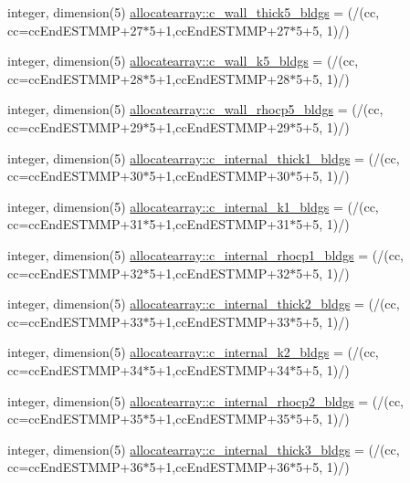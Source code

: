 \begin{DoxyCompactItemize}
\item 
integer, dimension(5) \hyperlink{namespaceallocatearray_ad95655da9944167e0208bf8454674fb6}{allocatearray\+::c\+\_\+wall\+\_\+thick5\+\_\+bldgs} = (/(cc, cc=cc\+End\+E\+S\+T\+M\+MP+27$\ast$5+1,cc\+End\+E\+S\+T\+M\+MP+27$\ast$5+5, 1)/)
\item 
integer, dimension(5) \hyperlink{namespaceallocatearray_a53001a7584fdc2aafd07c9e6809df27f}{allocatearray\+::c\+\_\+wall\+\_\+k5\+\_\+bldgs} = (/(cc, cc=cc\+End\+E\+S\+T\+M\+MP+28$\ast$5+1,cc\+End\+E\+S\+T\+M\+MP+28$\ast$5+5, 1)/)
\item 
integer, dimension(5) \hyperlink{namespaceallocatearray_a9fd17628369d7e612fbb9190cf2c92f2}{allocatearray\+::c\+\_\+wall\+\_\+rhocp5\+\_\+bldgs} = (/(cc, cc=cc\+End\+E\+S\+T\+M\+MP+29$\ast$5+1,cc\+End\+E\+S\+T\+M\+MP+29$\ast$5+5, 1)/)
\item 
integer, dimension(5) \hyperlink{namespaceallocatearray_a36130c9abba030f79380a76d8a252f2a}{allocatearray\+::c\+\_\+internal\+\_\+thick1\+\_\+bldgs} = (/(cc, cc=cc\+End\+E\+S\+T\+M\+MP+30$\ast$5+1,cc\+End\+E\+S\+T\+M\+MP+30$\ast$5+5, 1)/)
\item 
integer, dimension(5) \hyperlink{namespaceallocatearray_af2158ba2afb645dfef8aeb1a93a1dec7}{allocatearray\+::c\+\_\+internal\+\_\+k1\+\_\+bldgs} = (/(cc, cc=cc\+End\+E\+S\+T\+M\+MP+31$\ast$5+1,cc\+End\+E\+S\+T\+M\+MP+31$\ast$5+5, 1)/)
\item 
integer, dimension(5) \hyperlink{namespaceallocatearray_a1592e6ac2bce2d65c9e0ebe0e5c97122}{allocatearray\+::c\+\_\+internal\+\_\+rhocp1\+\_\+bldgs} = (/(cc, cc=cc\+End\+E\+S\+T\+M\+MP+32$\ast$5+1,cc\+End\+E\+S\+T\+M\+MP+32$\ast$5+5, 1)/)
\item 
integer, dimension(5) \hyperlink{namespaceallocatearray_af11e6ee064aaacc4d28820ad00309f0d}{allocatearray\+::c\+\_\+internal\+\_\+thick2\+\_\+bldgs} = (/(cc, cc=cc\+End\+E\+S\+T\+M\+MP+33$\ast$5+1,cc\+End\+E\+S\+T\+M\+MP+33$\ast$5+5, 1)/)
\item 
integer, dimension(5) \hyperlink{namespaceallocatearray_ab244f908ab9c1ad7b312e932bb423acc}{allocatearray\+::c\+\_\+internal\+\_\+k2\+\_\+bldgs} = (/(cc, cc=cc\+End\+E\+S\+T\+M\+MP+34$\ast$5+1,cc\+End\+E\+S\+T\+M\+MP+34$\ast$5+5, 1)/)
\item 
integer, dimension(5) \hyperlink{namespaceallocatearray_a4ec1b8fb02c4b559c4fb8d8b82b800fb}{allocatearray\+::c\+\_\+internal\+\_\+rhocp2\+\_\+bldgs} = (/(cc, cc=cc\+End\+E\+S\+T\+M\+MP+35$\ast$5+1,cc\+End\+E\+S\+T\+M\+MP+35$\ast$5+5, 1)/)
\item 
integer, dimension(5) \hyperlink{namespaceallocatearray_a1d2cef0d909c186f48abcaac79286f29}{allocatearray\+::c\+\_\+internal\+\_\+thick3\+\_\+bldgs} = (/(cc, cc=cc\+End\+E\+S\+T\+M\+MP+36$\ast$5+1,cc\+End\+E\+S\+T\+M\+MP+36$\ast$5+5, 1)/)

\end{DoxyCompactItemize}
